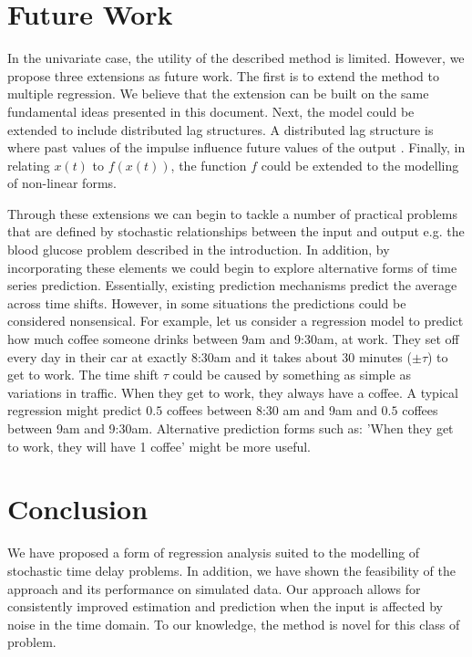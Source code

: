 \documentclass[11pt]{amsart}
\theoremstyle{definition}
\begin{document}
\section{Future Work}

In the univariate case, the utility of the described method is limited. However, we propose three extensions as future work. The first is to extend the method to multiple regression. We believe that the extension can be built on the same fundamental ideas presented in this document. Next, the model could be extended to include distributed lag structures. A distributed lag structure is where past values of the impulse influence future values of the output \cite{almon}. Finally, in relating $x(t)$ to $f(x(t))$, the function $f$ could be extended to the modelling of non-linear forms. 

Through these extensions we can begin to tackle a number of practical problems that are defined by stochastic relationships between the input and output e.g. the blood glucose problem described in the introduction. In addition, by incorporating these elements we could begin to explore alternative forms of time series prediction. Essentially, existing prediction mechanisms predict the average across time shifts. However, in some situations the predictions could be considered nonsensical. For example, let us consider a regression model to predict how much coffee someone drinks between 9am and 9:30am, at work. They set off every day in their car at exactly 8:30am and it takes about 30 minutes ($\pm \tau$) to get to work. The time shift $\tau$ could be caused by something as simple as variations in traffic. When they get to work, they always have a coffee. A typical regression might predict $0.5$ coffees between 8:30 am and 9am and $0.5$ coffees between 9am and 9:30am. Alternative prediction forms such as: 'When they get to work, they will have 1 coffee' might be more useful.

\section{Conclusion}

We have proposed a form of regression analysis suited to the modelling of stochastic time delay problems. In addition, we have shown the feasibility of the approach and its performance on simulated data. Our approach allows for consistently improved estimation and prediction when the input is affected by noise in the time domain. To our knowledge, the method is novel for this class of problem.


 
\end{document}
